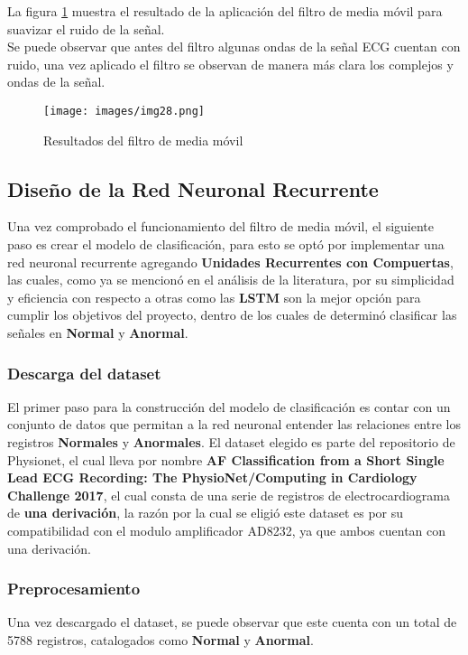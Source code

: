 La figura \ref{fig:Data_Fil} muestra el resultado de la aplicación del filtro de media móvil para suavizar el ruido de la señal.\\
Se puede observar que antes del filtro algunas ondas de la señal ECG cuentan con ruido, una vez aplicado el filtro se observan de manera más clara los complejos y ondas de la señal.


\begin{figure}[!ht]
    \centering
    \texttt{[image: images/img28.png]}
    \caption{Resultados del filtro de media móvil}
    \label{fig:Data_Fil}
\end{figure}

\subsection[]{Diseño de la Red Neuronal Recurrente}
Una vez comprobado el funcionamiento del filtro de media móvil, el siguiente paso es crear el modelo de clasificación, para esto se optó por implementar una red neuronal recurrente agregando \textbf{Unidades Recurrentes con Compuertas}, las cuales, como ya se mencionó en el análisis de la literatura, por su simplicidad y eficiencia con respecto a otras como las \textbf{LSTM} son la mejor opción para cumplir los objetivos del proyecto, dentro de los cuales de determinó clasificar las señales en \textbf{Normal} y \textbf{Anormal}.
\subsubsection{Descarga del dataset}
El primer paso para la construcción del modelo de clasificación es contar con un conjunto de datos que permitan a la red neuronal entender las relaciones entre los registros \textbf{Normales} y \textbf{Anormales}. El dataset elegido es parte del repositorio de Physionet, el cual lleva por nombre \textbf{AF Classification from a Short Single Lead ECG Recording: The PhysioNet/Computing in Cardiology Challenge 2017}, el cual consta de una serie de registros de electrocardiograma de \textbf{una derivación}, la razón por la cual se eligió este dataset es por su compatibilidad con el modulo amplificador AD8232, ya que ambos cuentan con una derivación.

\subsubsection{Preprocesamiento}
Una vez descargado el dataset, se puede observar que este cuenta con un total de 5788 registros, catalogados como \textbf{Normal} y \textbf{Anormal}.

